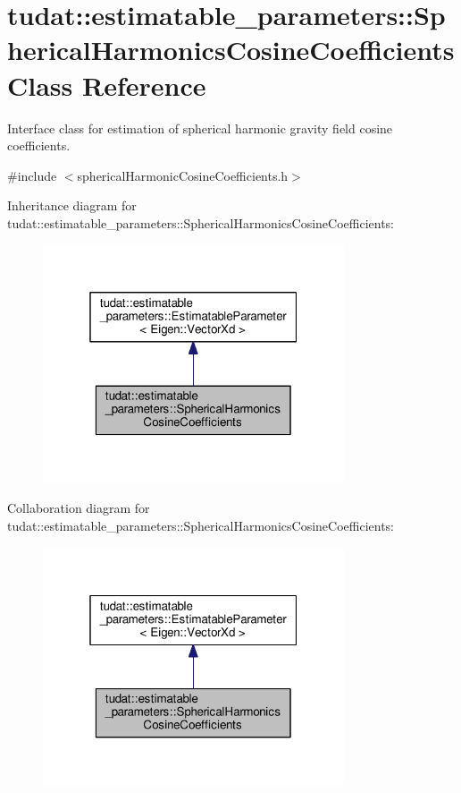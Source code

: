 \hypertarget{classtudat_1_1estimatable__parameters_1_1SphericalHarmonicsCosineCoefficients}{}\section{tudat\+:\+:estimatable\+\_\+parameters\+:\+:Spherical\+Harmonics\+Cosine\+Coefficients Class Reference}
\label{classtudat_1_1estimatable__parameters_1_1SphericalHarmonicsCosineCoefficients}


Interface class for estimation of spherical harmonic gravity field cosine coefficients.  




{\ttfamily \#include $<$spherical\+Harmonic\+Cosine\+Coefficients.\+h$>$}



Inheritance diagram for tudat\+:\+:estimatable\+\_\+parameters\+:\+:Spherical\+Harmonics\+Cosine\+Coefficients\+:
\nopagebreak
\begin{figure}[H]
\begin{center}
\leavevmode
\includegraphics[width=253pt]{classtudat_1_1estimatable__parameters_1_1SphericalHarmonicsCosineCoefficients__inherit__graph}
\end{center}
\end{figure}


Collaboration diagram for tudat\+:\+:estimatable\+\_\+parameters\+:\+:Spherical\+Harmonics\+Cosine\+Coefficients\+:
\nopagebreak
\begin{figure}[H]
\begin{center}
\leavevmode
\includegraphics[width=253pt]{classtudat_1_1estimatable__parameters_1_1SphericalHarmonicsCosineCoefficients__coll__graph}
\end{center}
\end{figure}
